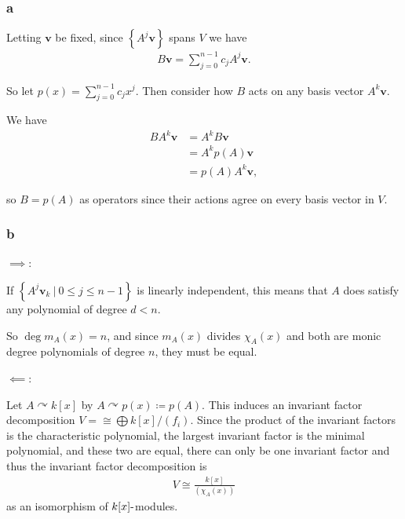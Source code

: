 \begin{solution}

\hypertarget{a-102}{%
\subsubsection{a}\label{a-102}}

Letting \(\mathbf{v}\) be fixed, since
\(\left\{{A^j \mathbf{v}}\right\}\) spans \(V\) we have
\begin{align*}
B\mathbf{v} = \sum_{j=0}^{n-1}c_j A^j \mathbf{v}
.\end{align*}

So let \(p(x) = \sum_{j=0}^{n-1}c_jx^j\). Then consider how \(B\) acts
on any basis vector \(A^k \mathbf{v}\).

We have
\begin{align*}
BA^k \mathbf{v} 
&= A^k B\mathbf{v} \\
&= A^k p(A) \mathbf{v} \\
&= p(A) A^k \mathbf{v}
,\end{align*}

so \(B = p(A)\) as operators since their actions agree on every basis
vector in \(V\).

\hypertarget{b-92}{%
\subsubsection{b}\label{b-92}}

\(\implies\):

If
\(\left\{{A^j \mathbf{v}_k {~\mathrel{\Big|}~}0\leq j \leq n-1}\right\}\)
is linearly independent, this means that \(A\) does satisfy any
polynomial of degree \(d < n\).

So \(\deg m_A(x) = n\), and since \(m_A(x)\) divides \(\chi_A(x)\) and
both are monic degree polynomials of degree \(n\), they must be equal.

\(\impliedby\):

Let \(A\curvearrowright k[x]\) by
\(A \curvearrowright p(x) \coloneqq p(A)\). This induces an invariant
factor decomposition \(V =\cong \bigoplus k[x]/(f_i)\). Since the
product of the invariant factors is the characteristic polynomial, the
largest invariant factor is the minimal polynomial, and these two are
equal, there can only be one invariant factor and thus the invariant
factor decomposition is
\begin{align*}
V\cong \frac{k[x]}{(\chi_A(x))}
\end{align*}
as an isomorphism of \(k[x]{\hbox{-}}\)modules.


\end{solution}
